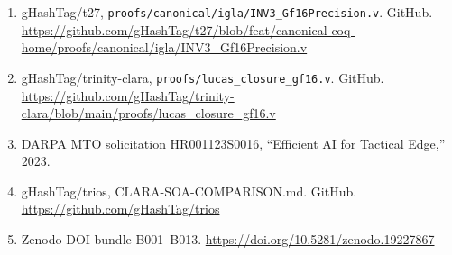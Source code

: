 \begin{enumerate}
  \item gHashTag/t27, \texttt{proofs/canonical/igla/INV3\_Gf16Precision.v}.
        GitHub.
        \url{https://github.com/gHashTag/t27/blob/feat/canonical-coq-home/proofs/canonical/igla/INV3_Gf16Precision.v}

  \item gHashTag/trinity-clara, \texttt{proofs/lucas\_closure\_gf16.v}.
        GitHub.
        \url{https://github.com/gHashTag/trinity-clara/blob/main/proofs/lucas_closure_gf16.v}

  \item DARPA MTO solicitation HR001123S0016, ``Efficient AI
        for Tactical Edge,'' 2023.

  \item gHashTag/trios, CLARA-SOA-COMPARISON.md.
        GitHub.
        \url{https://github.com/gHashTag/trios}

  \item Zenodo DOI bundle B001--B013.
        \url{https://doi.org/10.5281/zenodo.19227867}
\end{enumerate}
